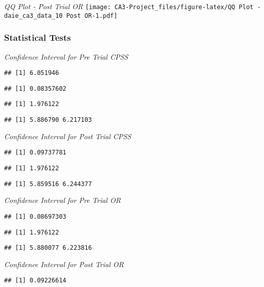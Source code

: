 \documentclass[
]{article}
\begin{document}
\emph{QQ Plot - Post Trial OR}
\texttt{[image: CA3-Project\_files/figure-latex/QQ Plot - daie\_ca3\_data\_10 Post OR-1.pdf]}

\hypertarget{statistical-tests}{%
\subsubsection{\texorpdfstring{\textbf{Statistical
Tests}}{Statistical Tests}}\label{statistical-tests}}

\emph{Confidence Interval for Pre Trial CPSS}

\begin{verbatim}
## [1] 6.051946
\end{verbatim}

\begin{verbatim}
## [1] 0.08357602
\end{verbatim}

\begin{verbatim}
## [1] 1.976122
\end{verbatim}

\begin{verbatim}
## [1] 5.886790 6.217103
\end{verbatim}

\emph{Confidence Interval for Post Trial CPSS}

\begin{verbatim}
## [1] 0.09737781
\end{verbatim}

\begin{verbatim}
## [1] 1.976122
\end{verbatim}

\begin{verbatim}
## [1] 5.859516 6.244377
\end{verbatim}

\emph{Confidence Interval for Pre Trial OR}

\begin{verbatim}
## [1] 0.08697303
\end{verbatim}

\begin{verbatim}
## [1] 1.976122
\end{verbatim}

\begin{verbatim}
## [1] 5.880077 6.223816
\end{verbatim}

\emph{Confidence Interval for Post Trial OR}

\begin{verbatim}
## [1] 0.09226614
\end{verbatim}
\end{document}
